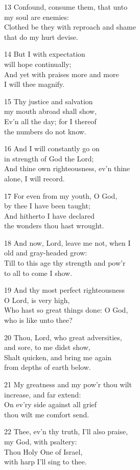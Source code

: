 13 Confound, consume them, that unto\\
my soul are enemies:\\
Clothed be they with reproach and shame\\
that do my hurt devise.

14 But I with expectation\\
will hope continually;\\
And yet with praises more and more\\
I will thee magnify.

15 Thy justice and salvation\\
my mouth abroad shall show,\\
Ev’n all the day; for I thereof\\
the numbers do not know.

16 And I will constantly go on\\
in strength of God the Lord;\\
And thine own righteousness, ev’n thine\\
alone, I will record.

17 For even from my youth, O God,\\
by thee I have been taught;\\
And hitherto I have declared\\
the wonders thou hast wrought.

18 And now, Lord, leave me not, when I\\
old and gray-headed grow:\\
Till to this age thy strength and pow’r\\
to all to come I show.

19 And thy most perfect righteousness\\
O Lord, is very high,\\
Who hast so great things done: O God,\\
who is like unto thee?

20 Thou, Lord, who great adversities,\\
and sore, to me didst show,\\
Shalt quicken, and bring me again\\
from depths of earth below.

21 My greatness and my pow’r thou wilt\\
increase, and far extend:\\
On ev’ry side against all grief\\
thou wilt me comfort send.

22 Thee, ev’n thy truth, I’ll also praise,\\
my God, with psaltery:\\
Thou Holy One of Israel,\\
with harp I’ll sing to thee.

